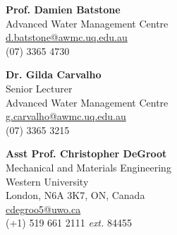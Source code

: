 




\textbf{Prof. Damien Batstone}\\
Advanced Water Management Centre\\
\href{mailto:d.batstone@awmc.uq.edu.au}{d.batstone@awmc.uq.edu.au}\\
(07) 3365 4730

\bigskip
\textbf{Dr. Gilda Carvalho}\\
Senior Lecturer\\
Advanced Water Management Centre\\
\href{mailto:g.carvalho@awmc.uq.edu.au}{g.carvalho@awmc.uq.edu.au}\\
(07) 3365 3215


\bigskip
\textbf{Asst Prof. Christopher DeGroot}\\
Mechanical and Materials Engineering\\
Western University\\
London, N6A 3K7, ON, Canada\\
\href{mailto:cdegroo5@uwo.ca}{cdegroo5@uwo.ca}\\
(+1) 519 661 2111 \textit{ext.} 84455



